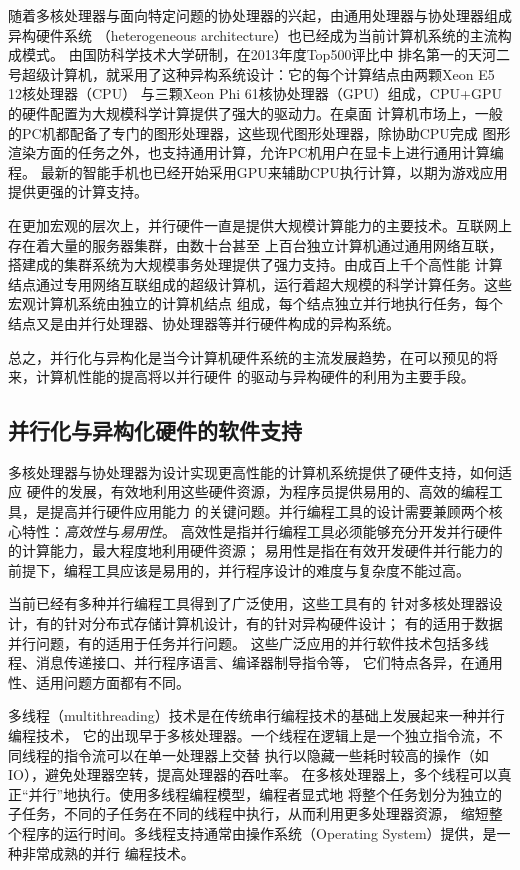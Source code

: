 随着多核处理器与面向特定问题的协处理器的兴起，由通用处理器与协处理器组成异构硬件系统
（heterogeneous architecture）也已经成为当前计算机系统的主流构成模式。
由国防科学技术大学研制，在2013年度Top500评比中
排名第一的天河二号超级计算机，就采用了这种异构系统设计：它的每个计算结点由两颗Xeon E5 12核处理器（CPU）
与三颗Xeon Phi 61核协处理器（GPU）组成，CPU+GPU的硬件配置为大规模科学计算提供了强大的驱动力。在桌面
计算机市场上，一般的PC机都配备了专门的图形处理器，这些现代图形处理器，除协助CPU完成
图形渲染方面的任务之外，也支持通用计算，允许PC机用户在显卡上进行通用计算编程。
最新的智能手机也已经开始采用GPU来辅助CPU执行计算，以期为游戏应用提供更强的计算支持。

在更加宏观的层次上，并行硬件一直是提供大规模计算能力的主要技术。互联网上存在着大量的服务器集群，由数十台甚至
上百台独立计算机通过通用网络互联，搭建成的集群系统为大规模事务处理提供了强力支持。由成百上千个高性能
计算结点通过专用网络互联组成的超级计算机，运行着超大规模的科学计算任务。这些宏观计算机系统由独立的计算机结点
组成，每个结点独立并行地执行任务，每个结点又是由并行处理器、协处理器等并行硬件构成的异构系统。

总之，并行化与异构化是当今计算机硬件系统的主流发展趋势，在可以预见的将来，计算机性能的提高将以并行硬件
的驱动与异构硬件的利用为主要手段。

\subsection{并行化与异构化硬件的软件支持}
多核处理器与协处理器为设计实现更高性能的计算机系统提供了硬件支持，如何适应
硬件的发展，有效地利用这些硬件资源，为程序员提供易用的、高效的编程工具，是提高并行硬件应用能力
的关键问题。并行编程工具的设计需要兼顾两个核心特性：\emph{高效性}与\emph{易用性}。
高效性是指并行编程工具必须能够充分开发并行硬件的计算能力，最大程度地利用硬件资源；
易用性是指在有效开发硬件并行能力的前提下，编程工具应该是易用的，并行程序设计的难度与复杂度不能过高。

当前已经有多种并行编程工具得到了广泛使用，这些工具有的
针对多核处理器设计，有的针对分布式存储计算机设计，有的针对异构硬件设计；
有的适用于数据并行问题，有的适用于任务并行问题。
这些广泛应用的并行软件技术包括多线程、消息传递接口、并行程序语言、编译器制导指令等，
它们特点各异，在通用性、适用问题方面都有不同。

多线程（multithreading）技术是在传统串行编程技术的基础上发展起来一种并行编程技术，
它的出现早于多核处理器。一个线程在逻辑上是一个独立指令流，不同线程的指令流可以在单一处理器上交替
执行以隐藏一些耗时较高的操作（如IO），避免处理器空转，提高处理器的吞吐率。
在多核处理器上，多个线程可以真正“并行”地执行。使用多线程编程模型，编程者显式地
将整个任务划分为独立的子任务，不同的子任务在不同的线程中执行，从而利用更多处理器资源，
缩短整个程序的运行时间。多线程支持通常由操作系统（Operating System）提供，是一种非常成熟的并行
编程技术。%

